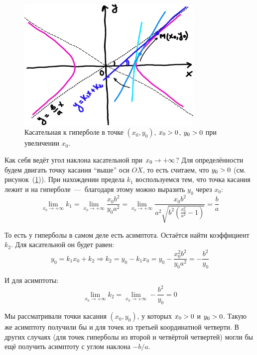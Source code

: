 \documentclass[a4paper,12pt]{article}
\begin{document}
  \begin{figure}[h]
    \centering
    
    \includegraphics[width=0.8\textwidth]{hyperbolic_tangent_to_asymptote}
    
    \caption{Касательная к гиперболе в точке $(x_0, y_0)$, $x_0 \hm> 0$, $y_0 \hm> 0$ при увеличении $x_0$.}
    \label{fig:hyperbolic_tangent_to_asymptote}
  \end{figure}
  
  Как себя ведёт угол наклона касательной при $x_0 \hm\to +\infty$?
  Для определённости будем двигать точку касания ``выше'' оси $OX$, то есть считаем, что $y_0 \hm> 0$ (см. рисунок~(\ref{fig:hyperbolic_tangent_to_asymptote})).
  При нахождении предела $k_1$ воспользуемся тем, что точка касания лежит и на гиперболе~---~благодаря этому можно выразить $y_0$ через $x_0$:
  \[
    \lim_{x_0\to +\infty} k_1
      = \lim_{x_0\to +\infty} \frac{x_0 b^2}{y_0 a^2}
      = \lim_{x_0\to +\infty} \frac{x_0 b^2}{a^2 \sqrt{b^2 \left(\frac{x_0^2}{a^2} - 1\right)}}
      = \frac{b}{a}
  \]
  
  То есть у гиперболы в самом деле есть асимптота.
  Остаётся найти коэффициент $k_2$.
  Для касательной он будет равен:
  \[
    y_0 = k_1 x_0 + k_2 \Rightarrow k_2 = y_0 - k_1 x_0 = y_0 - \frac{x_0^2 b^2}{y_0 a^2} = -\frac{b^2}{y_0}
  \]
  
  И для асимптоты:
  \[
    \lim_{x_0\to +\infty} k_2
    = \lim_{x_0\to +\infty} -\frac{b^2}{y_0}
    = 0
  \]
  
  Мы рассматривали точки касания $(x_0, y_0)$, у которых $x_0 \hm> 0$ и $y_0 \hm> 0$.
  Такую же асимптоту получили бы и для точек из третьей координатной четверти.
  В других случаях (для точек гиперболы из второй и четвёртой четвертей) могли бы ещё получить асимптоту с углом наклона $-b/a$.
  
\end{document}
